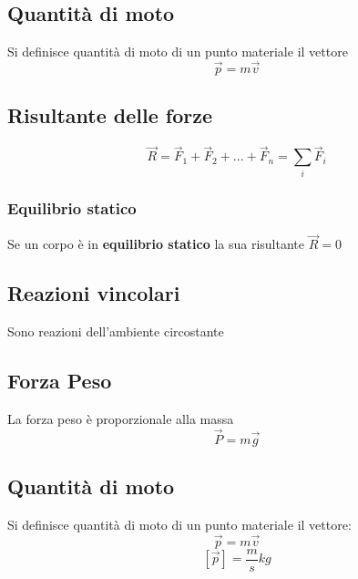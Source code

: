 \documentclass[a4paper]{report}
\begin{document}
  \subsection{Quantità di moto}
  Si definisce quantità di moto di un punto materiale il vettore
  \[ \vec{p} = m\vec{v} \]

  \subsection{Risultante delle forze}
  \[ \vec{R} = \vec{F}_1 + \vec{F}_2 + ... +\vec{F}_n = \sum_i \vec{F}_i \]

  \subsubsection{Equilibrio statico}
  Se un corpo è in \textbf{equilibrio statico} la sua risultante $\vec{R} = 0$

  \subsection{Reazioni vincolari}
  Sono reazioni dell'ambiente circostante

  \subsection{Forza Peso}
  La forza peso è proporzionale alla massa
  \[ \vec{P} = m\vec{g} \]




































  \subsection{Quantità di moto}
  Si definisce quantità di moto di un punto materiale il vettore:
  \[ \vec{p} = m \vec{v} \]
  \[ [\vec{p}] = \frac{m}{s} kg \]
\end{document}
